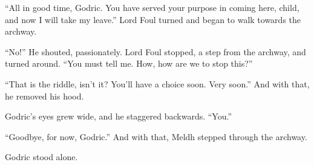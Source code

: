 “All in good time, Godric. You have served your purpose in coming here, child, and now I will take my leave.” Lord Foul turned and began to walk towards the archway.

“No!” He shouted, passionately. Lord Foul stopped, a step from the archway, and turned around. “You must tell me. How, how are we to stop this?”

“That is the riddle, isn’t it? You’ll have a choice soon. Very soon.” And with that, he removed his hood.

Godric’s eyes grew wide, and he staggered backwards. “You.”

“Goodbye, for now, Godric.” And with that, Meldh stepped through the archway.

Godric stood alone.